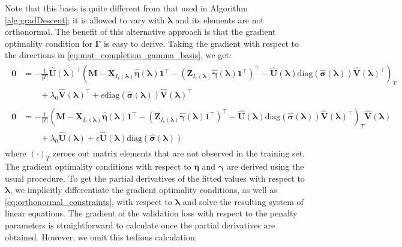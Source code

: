\documentclass[12pt,letterpaper]{article}
\begin{document}
Note that this basis is quite different from that used in Algorithm \ref{alg:gradDescent}; it is allowed to vary with $\boldsymbol{\lambda}$ and its elements are not orthonormal. The benefit of this alternative approach is that the gradient optimality condition for $\boldsymbol{\Gamma}$ is easy to derive. Taking the gradient with respect to the directions in \ref{eq:mat_completion_gamma_basis}, we get:
\begin{align}
\begin{split}
\boldsymbol{0} & = 
- \frac{1}{|T|} 
\hat{\boldsymbol{U}}(\boldsymbol{\lambda})^\top
\left (
\boldsymbol{M} 
- \boldsymbol{X}_{I_r(\boldsymbol{\lambda})} \hat{\boldsymbol{\eta}}(\boldsymbol{\lambda}) \boldsymbol{1}^\top 
- (\boldsymbol{Z}_{I_c(\boldsymbol{\lambda})} \hat{\boldsymbol{\gamma}}(\boldsymbol{\lambda})  \boldsymbol{1}^\top )^\top
- \hat{\boldsymbol{U}}(\boldsymbol{\lambda})\text{diag}(\hat{\boldsymbol{\sigma}}(\boldsymbol{\lambda})) \hat{\boldsymbol{V}}(\boldsymbol{\lambda})^\top
\right )_T
\\
& \qquad + \lambda_0 \hat{\boldsymbol{V}}(\boldsymbol{\lambda})^\top
+ \epsilon \text{diag}(\hat{\boldsymbol{\sigma}}(\boldsymbol{\lambda})) \hat{\boldsymbol{V}}(\boldsymbol{\lambda})^\top
\end{split}
\label{eq:grad_opt_matrix_left}
\\
\begin{split}
\boldsymbol{0} & = - \frac{1}{|T|} 
\left (
\boldsymbol{M} 
- \boldsymbol{X}_{I_r(\boldsymbol{\lambda})} \hat{\boldsymbol{\eta}}(\boldsymbol{\lambda}) \boldsymbol{1}^\top 
- (\boldsymbol{Z}_{I_c(\boldsymbol{\lambda})} \hat{\boldsymbol{\gamma}}(\boldsymbol{\lambda})  \boldsymbol{1}^\top )^\top
- \hat{\boldsymbol{U}}(\boldsymbol{\lambda})\text{diag}(\hat{\boldsymbol{\sigma}}(\boldsymbol{\lambda})) \hat{\boldsymbol{V}}(\boldsymbol{\lambda})^\top
\right )_T
\hat{\boldsymbol{V}}(\boldsymbol{\lambda})
\\
& \qquad + \lambda_0 \hat{\boldsymbol{U}}(\boldsymbol{\lambda})
+ \epsilon \hat{\boldsymbol{U}}(\boldsymbol{\lambda}) \text{diag}(\hat{\boldsymbol{\sigma}}(\boldsymbol{\lambda}))
\end{split}
\label{eq:grad_opt_matrix_comp}
\end{align}
where $(\cdot)_T$ zeroes out matrix elements that are not observed in the training set. The gradient optimality conditions with respect to $\boldsymbol{\eta}$ and $\boldsymbol{\gamma}$ are derived using the usual procedure. To get the partial derivatives of the fitted values with respect to $\boldsymbol{\lambda}$, we implicitly differentiate the gradient optimality conditions, as well as \eqref{eq:orthonormal_constraints}, with respect to $\boldsymbol{\lambda}$ and solve the resulting system of linear equations. The gradient of the validation loss with respect to the penalty parameters is straightforward to calculate once the partial derivatives are obtained. However, we omit this tedious calculation.
\end{document}
